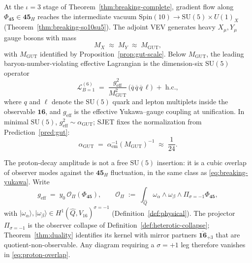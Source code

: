 \documentclass[aps,prd,onecolumn,amsmath,amssymb,nofootinbib,11pt]{revtex4-2}
\numberwithin{equation}{section}
\theoremstyle{plain}
\theoremstyle{definition}
\theoremstyle{remark}
\newcommand{\Spin}{\mathrm{Spin}}
\begin{document}
At the $\iota=3$ stage of Theorem~\ref{thm:breaking-complete}, gradient flow
along $\Phi_{\mathbf{45}}\in\mathbf{45}_H$ reaches the intermediate vacuum
$\Spin(10)\to\mathrm{SU}(5)\times U(1)_X$
(Theorem~\ref{thm:breaking-so10su5}). The adjoint VEV generates heavy
$X_\mu,Y_\mu$ gauge bosons with mass
\begin{equation}\label{eq:proton-XY-mass}
  M_X \;\approx\; M_Y \;\approx\; M_{\mathrm{GUT}},
\end{equation}
with $M_{\mathrm{GUT}}$ identified by Proposition~\ref{prop:gut-scale}. Below
$M_{\mathrm{GUT}}$, the leading baryon-number-violating effective Lagrangian is
the dimension-six $\mathrm{SU}(5)$ operator
\begin{equation}\label{eq:proton-dim6}
  \mathcal{L}_{B=1}^{(6)}
  \;=\;
  \frac{g_{\mathrm{eff}}^{2}}{M_{\mathrm{GUT}}^{2}}\,
  \bigl(\overline{q}\,\overline{q}\,\overline{q}\,\ell\bigr)
  \;+\;\mathrm{h.c.},
\end{equation}
where $q$ and $\ell$ denote the $\mathrm{SU}(5)$ quark and lepton multiplets
inside the observable $\mathbf{16}$, and $g_{\mathrm{eff}}$ is the effective
Yukawa--gauge coupling at unification. In minimal $\mathrm{SU}(5)$,
$g_{\mathrm{eff}}^{2}\sim\alpha_{\mathrm{GUT}}$; SJET fixes the normalization
from Prediction~\ref{pred:gut}:
\begin{equation}\label{eq:alpha-gut}
  \alpha_{\mathrm{GUT}}
  \;=\;
  \alpha_{\mathrm{em}}^{-1}(M_{\mathrm{GUT}})^{-1}
  \;\approx\;
  \frac{1}{24}.
\end{equation}

The proton-decay amplitude is not a free $\mathrm{SU}(5)$ insertion: it is a
cubic overlap of observer modes against the $\mathbf{45}_H$ fluctuation, in
the same class as \eqref{eq:breaking-yukawa}. Write
\begin{equation}\label{eq:proton-overlap}
  g_{\mathrm{eff}}
  \;=\;
  y_0\,
  \mathcal{O}_{\Pi}\!\left(\Phi_{\mathbf{45}}\right),
  \qquad
  \mathcal{O}_{\Pi}
  \;:=\;
  \int_{\hat Q}
  \omega_\alpha \wedge \omega_\beta \wedge \Pi_{\sigma=-1}\Phi_{\mathbf{45}},
\end{equation}
with $|\omega_\alpha\rangle,|\omega_\beta\rangle\in
H^1(\hat Q,V_{16})^{\sigma=-1}$ (Definition~\ref{def:physical}). The projector
$\Pi_{\sigma=-1}$ is the observer collapse of
Definition~\ref{def:heterotic-collapse}; Theorem~\ref{thm:duality} identifies
its kernel with mirror partners $\overline{\mathbf{16}}_{+3}$ that are
quotient-non-observable. Any diagram requiring a $\sigma=+1$ leg therefore
vanishes in \eqref{eq:proton-overlap}.
\end{document}
